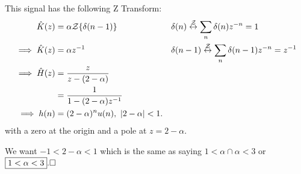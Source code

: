 This signal has the following Z Transform:
\begin{align*}
    \hat K(z) 
    &= \alpha \mathcal Z\{\delta(n-1)\}
    &&\delta(n) \stackrel{\mathcal{Z}}{\leftrightarrow} \sum_n \delta(n)z^{-n}=1
    \\
    \implies
    \hat K(z) 
    &= \alpha z^{-1}
    &&\delta(n-1) \stackrel{\mathcal{Z}}{\leftrightarrow} \sum_n \delta(n-1)z^{-n}=z^{-1}
    \\
    \implies
    \hat H(z) 
    &= \frac{z}{z-(2-\alpha)}
    \\
    &= \frac{1}{1-(2-\alpha)z^{-1}}
    \\
    \implies
    h(n)
    &=
    (2-\alpha)^n u(n),\ |2-\alpha|<1.
\end{align*}
with a zero at the origin and a pole at $z=2-\alpha$.

We want $-1<2-\alpha<1$ which is the same as saying $1<\alpha \cap \alpha<3$ or $\boxed{1<\alpha<3}.\hfill\square$

